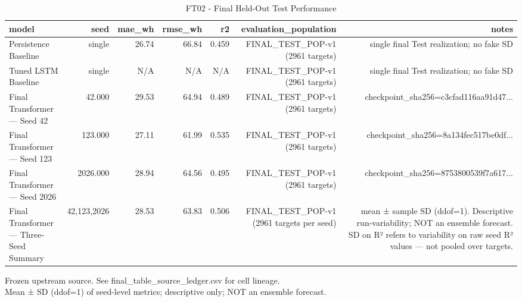 \begin{table}[h!]
\centering
\caption{FT02 - Final Held-Out Test Performance}
\label{tab:ft02\_-\_final\_held-out\_test\_performance}
\begin{tabular}{lrrrrrr}
\toprule
model & seed & mae\_wh & rmse\_wh & r2 & evaluation\_population & notes \\
\midrule
Persistence Baseline & single & 26.74 & 66.84 & 0.459 & FINAL\_TEST\_POP-v1 (2961 targets) & single final Test realization; no fake SD \\
Tuned LSTM Baseline & single & N/A & N/A & N/A & FINAL\_TEST\_POP-v1 (2961 targets) & single final Test realization; no fake SD \\
Final Transformer — Seed 42 & 42.000 & 29.53 & 64.94 & 0.489 & FINAL\_TEST\_POP-v1 (2961 targets) & checkpoint\_sha256=c3cfad116aa91d47... \\
Final Transformer — Seed 123 & 123.000 & 27.11 & 61.99 & 0.535 & FINAL\_TEST\_POP-v1 (2961 targets) & checkpoint\_sha256=8a134fec517be0df... \\
Final Transformer — Seed 2026 & 2026.000 & 28.94 & 64.56 & 0.495 & FINAL\_TEST\_POP-v1 (2961 targets) & checkpoint\_sha256=8753800539f7a617... \\
Final Transformer — Three-Seed Summary & 42,123,2026 & 28.53 & 63.83 & 0.506 & FINAL\_TEST\_POP-v1 (2961 targets per seed) & mean ± sample SD (ddof=1). Descriptive run-variability; NOT an ensemble forecast. SD on R² refers to variability on raw seed R² values — not pooled over targets. \\
\bottomrule
\end{tabular}
\vspace{4pt}
\footnotesize{Frozen upstream source. See final\_table\_source\_ledger.csv for cell lineage.}\\
\footnotesize{Mean ± SD (ddof=1) of seed-level metrics; descriptive only; NOT an ensemble forecast.}\\
\end{table}
